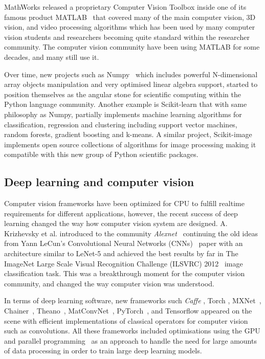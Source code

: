 MathWorks released a proprietary Computer Vision Toolbox inside one of its famous product MATLAB~\citep{MATLAB:2010} that covered many of the main computer vision, 3D vision, and video processing algorithms which has been used by many computer vision students and researchers becoming quite standard within the researcher community. The computer vision community have been using MATLAB for some decades, and many still use it.

Over time, new projects such as Numpy~\citep{oliphant2006guide} which includes powerful N-dimensional array objects manipulation and very optimised linear algebra support, started to position themselves as the angular stone for scientific computing within the Python language community. Another example is Scikit-learn \citep{scikit-learn} that with same philosophy as Numpy, partially implements machine learning algorithms  for classification, regression and clustering including support vector machines, random forests, gradient boosting and k-means. A similar project,  Scikit-image~\citep{scikit-image} implements open source collections of algorithms for image processing making it compatible with this new group of Python scientific packages.

\subsection{Deep learning and computer vision}
\label{section:related_work:deep_learning}
Computer vision frameworks have been optimized for CPU to fulfill realtime requirements for different applications, however, the recent success of deep learning changed the way how computer vision system are designed. A. Krizhevsky et al. introduced to the community \textit{Alexnet}~\citep{AlexNet2012} continuing the old ideas from Yann LeCun's Convolutional Neural Networks (CNNs)~\citep{MNIST1998} paper with an architecture similar to LeNet-5 and achieved the best results by far in The ImageNet Large Scale Visual Recognition Challenge (ILSVRC)  2012~\citep{ILSVRC15} image classification task. This was a breakthrough moment for the computer vision community, and changed the way computer vision was understood.

In terms of deep learning software, new frameworks such \textit{Caffe} \citep{caffe}, Torch \citep{torch7}, MXNet~\citep{journals/corr/ChenLLLWWXXZZ15}, Chainer~\citep{Tokui:2019:CDL:3292500.3330756}, Theano~\citep{Bergstra10theano}, MatConvNet~\citep{Vedaldi15}, PyTorch~\citep{pytorch}, and Tensorflow \citep{tensorflow2015-whitepaper} appeared on the scene with efficient implementations of classical operators for computer vision such as convolutions. All these frameworks included  optimisations using the GPU and parallel programming~\citep{CookCUDA} as an approach to handle the need for large amounts of data processing in order to train large deep learning models.

